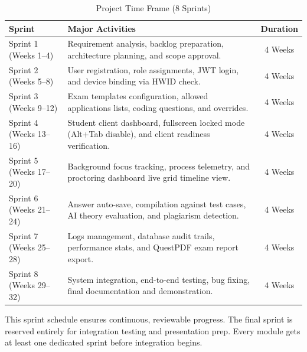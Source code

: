\begin{table}[H]
\centering
\caption{Project Time Frame (8 Sprints)}
\label{tab:timeframe}
\renewcommand{\arraystretch}{1.25}
\begin{tabular}{lp{8.2cm}c}
\hline\hline
\textbf{Sprint} & \textbf{Major Activities} & \textbf{Duration} \\
\hline\hline
Sprint 1 (Weeks 1--4)   & Requirement analysis, backlog preparation, architecture planning, and scope approval. & 4 Weeks \\
Sprint 2 (Weeks 5--8)   & User registration, role assignments, JWT login, and device binding via HWID check. & 4 Weeks \\
Sprint 3 (Weeks 9--12)  & Exam templates configuration, allowed applications lists, coding questions, and overrides. & 4 Weeks \\
Sprint 4 (Weeks 13--16) & Student client dashboard, fullscreen locked mode (Alt+Tab disable), and client readiness verification. & 4 Weeks \\
Sprint 5 (Weeks 17--20) & Background focus tracking, process telemetry, and proctoring dashboard live grid timeline view. & 4 Weeks \\
Sprint 6 (Weeks 21--24) & Answer auto-save, compilation against test cases, AI theory evaluation, and plagiarism detection. & 4 Weeks \\
Sprint 7 (Weeks 25--28) & Logs management, database audit trails, performance stats, and QuestPDF exam report export. & 4 Weeks \\
Sprint 8 (Weeks 29--32) & System integration, end-to-end testing, bug fixing, final documentation and demonstration. & 4 Weeks \\
\hline\hline
\end{tabular}
\end{table}

This sprint schedule ensures continuous, reviewable progress. The final sprint is reserved entirely for integration testing and presentation prep. Every module gets at least one dedicated sprint before integration begins.
